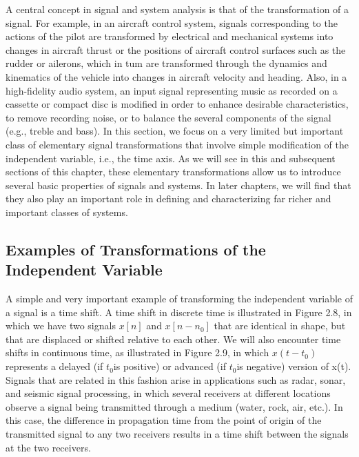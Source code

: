 \documentclass{report}
\begin{document}
A central concept in signal and system analysis is that of the transformation of a signal. For example, in an aircraft control system, signals corresponding
to the actions of the pilot are transformed by electrical and mechanical systems into changes in aircraft thrust or the positions of aircraft control
surfaces such as the rudder or ailerons, which in tum are transformed through the dynamics and kinematics of the vehicle into changes in aircraft
velocity and heading. Also, in a high-fidelity audio system, an input signal representing music as recorded on a cassette or compact disc is modified
in order to enhance desirable characteristics, to remove recording noise, or to balance the several components of the signal (e.g., treble and bass).
In this section, we focus on a very limited but important class of elementary signal transformations that involve simple modification of the independent
variable, i.e., the time axis. As we will see in this and subsequent sections of this chapter, these elementary transformations allow us to introduce
several basic properties of signals and systems. In later chapters, we will find that they also play an important role in defining and characterizing
far richer and important classes of systems.

\subsection*{Examples of Transformations of the Independent Variable}

A simple and very important example of transforming the independent variable of a signal is a time shift. A time shift in discrete time is illustrated
in Figure 2.8, in which we have two signals \(x[n]\) and \(x\left[n - n_0\right]\) that are identical in shape, but that are displaced or shifted
relative to each other. We will also encounter time shifts in continuous time, as illustrated in Figure 2.9, in which \(x\left(t - t_0\right)\) represents
a delayed (if \(t_0\)is positive) or advanced (if \(t_0\)is negative) version of x(t). Signals that are related in this fashion arise in applications
such as radar, sonar, and seismic signal processing, in which several receivers at different locations observe a signal being transmitted through
a medium (water, rock, air, etc.). In this case, the difference in propagation time from the point of origin of the transmitted signal to any two
receivers results in a time shift between the signals at the two receivers.
\end{document}
